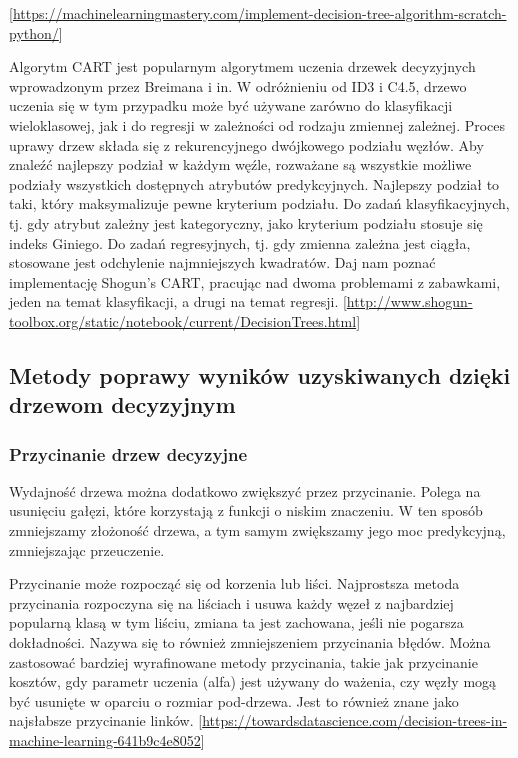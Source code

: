 \documentclass[10pt,a4paper]{article}
\begin{document}
[\url{https://machinelearningmastery.com/implement-decision-tree-algorithm-scratch-python/}]















Algorytm CART jest popularnym algorytmem uczenia drzewek decyzyjnych wprowadzonym przez Breimana i in. W odróżnieniu od ID3 i C4.5, drzewo uczenia się w tym przypadku może być używane zarówno do klasyfikacji wieloklasowej, jak i do regresji w zależności od rodzaju zmiennej zależnej. Proces uprawy drzew składa się z rekurencyjnego dwójkowego podziału węzłów. Aby znaleźć najlepszy podział w każdym węźle, rozważane są wszystkie możliwe podziały wszystkich dostępnych atrybutów predykcyjnych. Najlepszy podział to taki, który maksymalizuje pewne kryterium podziału. Do zadań klasyfikacyjnych, tj. gdy atrybut zależny jest kategoryczny, jako kryterium podziału stosuje się indeks Giniego. Do zadań regresyjnych, tj. gdy zmienna zależna jest ciągła, stosowane jest odchylenie najmniejszych kwadratów. Daj nam poznać implementację Shogun's CART, pracując nad dwoma problemami z zabawkami, jeden na temat klasyfikacji, a drugi na temat regresji.
[\url{http://www.shogun-toolbox.org/static/notebook/current/DecisionTrees.html}]


\subsection{Metody poprawy wyników uzyskiwanych dzięki drzewom decyzyjnym}
\subsubsection{Przycinanie drzew decyzyjne}
Wydajność drzewa można dodatkowo zwiększyć przez przycinanie. Polega na usunięciu gałęzi, które korzystają z funkcji o niskim znaczeniu. W ten sposób zmniejszamy złożoność drzewa, a tym samym zwiększamy jego moc predykcyjną, zmniejszając przeuczenie.

Przycinanie może rozpocząć się od korzenia lub liści. Najprostsza metoda przycinania rozpoczyna się na liściach i usuwa każdy węzeł z najbardziej popularną klasą w tym liściu, zmiana ta jest zachowana, jeśli nie pogarsza dokładności. Nazywa się to również zmniejszeniem przycinania błędów. Można zastosować bardziej wyrafinowane metody przycinania, takie jak przycinanie kosztów, gdy parametr uczenia (alfa) jest używany do ważenia, czy węzły mogą być usunięte w oparciu o rozmiar pod-drzewa. Jest to również znane jako najsłabsze przycinanie linków.
[\url{https://towardsdatascience.com/decision-trees-in-machine-learning-641b9c4e8052}]
\end{document}
